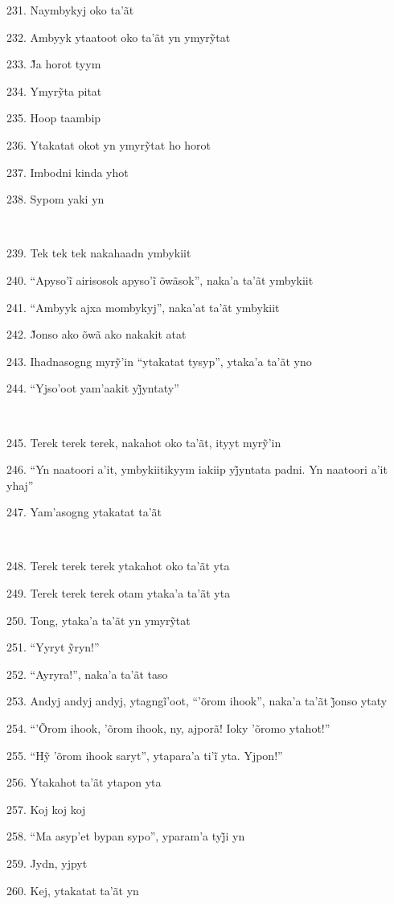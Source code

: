 231. Naymbykyj oko ta'ãt

232. Ambyyk ytaatoot oko ta’ãt yn ymyrỹtat

233. J̃a horot tyym

234. Ymyrỹta pitat

235. Hoop taambip

236. Ytakatat okot yn ymyrỹtat ho horot

237. Imbodni kinda yhot

238. Sypom yaki yn

~

239. Tek tek tek nakahaadn ymbykiit

240. ``Apyso’ĩ airisosok apyso’ĩ õwãsok'', naka’a ta’ãt ymbykiit

241. ``Ambyyk ajxa mombykyj'', naka'at ta'ãt ymbykiit

242. J̃onso ako õwã ako nakakit atat

243. Ihadnasogng myrỹ’in ``ytakatat tysyp'', ytaka’a ta’ãt yno

244. ``Yjso’oot yam’aakit yj̃yntaty''

~

245. Terek terek terek, nakahot oko ta’ãt, ityyt myrỹ’in

246. ``Yn naatoori a’it, ymbykiitikyym iakiip yj̃yntata padni. Yn naatoori a’it yhaj''

247. Yam'asogng ytakatat ta'ãt

~

248. Terek terek terek ytakahot oko ta'ãt yta

249. Terek terek terek otam ytaka'a ta'ãt yta

250. Tong, ytaka’a ta’ãt yn ymyrỹtat

251. ``Yyryt ỹryn!''

252. ``Ayryra!'', naka'a ta'ãt taso

253. Andyj andyj andyj, ytagngĩ’oot, ``’õrom ihook'', naka’a ta’ãt j̃onso ytaty

254. ``'Õrom ihook, 'õrom ihook, ny, ajporã! Ioky 'õromo ytahot!''

255. ``Hỹ ’õrom ihook saryt'', ytapara’a ti’ĩ yta. Yjpon!''

256. Ytakahot ta'ãt ytapon yta

257. Koj koj koj

258. ``Ma asyp’et bypan sypo'', yparam’a tyj̃i yn

259. Jydn, yjpyt

260. Kej, ytakatat ta'ãt yn

~

